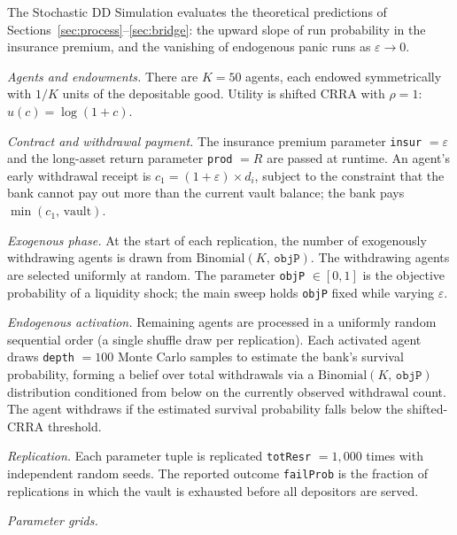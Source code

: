 The Stochastic DD Simulation evaluates the theoretical predictions of
Sections~\ref{sec:process}--\ref{sec:bridge}: the upward slope
of run probability in the insurance premium, and the vanishing of
endogenous panic runs as $\varepsilon \to 0$.

\medskip

\noindent\textit{Agents and endowments.}\; There are $K = 50$
agents, each endowed symmetrically with $1/K$ units of the
depositable good. Utility is shifted CRRA with $\rho = 1$:
$u(c) = \log(1+c)$.

\medskip

\noindent\textit{Contract and withdrawal payment.}\; The insurance
premium parameter \texttt{insur} $= \varepsilon$ and the long-asset
return parameter \texttt{prod} $= R$ are passed at runtime. An
agent's early withdrawal receipt is $c_1 = (1+\varepsilon)\times
d_i$, subject to the constraint that the bank cannot pay out more
than the current vault balance; the bank pays $\min(c_1,\,
\text{vault})$.

\medskip

\noindent\textit{Exogenous phase.}\; At the start of each
replication, the number of exogenously withdrawing agents is drawn
from $\mathrm{Binomial}(K,\, \texttt{objP})$. The withdrawing agents
are selected uniformly at random. The parameter \texttt{objP}
$\in [0,1]$ is the objective probability of a liquidity shock; the
main sweep holds \texttt{objP} fixed while varying $\varepsilon$.

\medskip

\noindent\textit{Endogenous activation.}\; Remaining agents are
processed in a uniformly random sequential order (a single shuffle
draw per replication). Each activated agent draws
\texttt{depth} $= 100$ Monte Carlo samples to estimate the
bank's survival probability, forming a belief over total
withdrawals via a $\mathrm{Binomial}(K,\, \texttt{objP})$
distribution conditioned from below on the currently observed
withdrawal count. The agent withdraws if the estimated survival
probability falls below the shifted-CRRA threshold.

\medskip

\noindent\textit{Replication.}\; Each parameter tuple is replicated
\texttt{totResr} $= 1{,}000$ times with independent random seeds.
The reported outcome \texttt{failProb} is the fraction of
replications in which the vault is exhausted before all depositors
are served.

\medskip

\noindent\textit{Parameter grids.}\;

